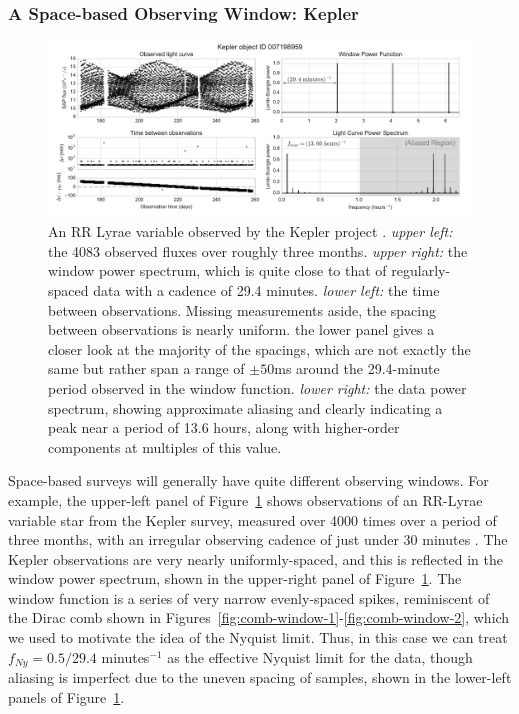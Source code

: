 \documentclass[preprint]{aastex}
\newcommand{\fig}[1]{Figure~\ref{fig:#1}}
\newcommand{\figs}[2]{Figures~\ref{fig:#1}-\ref{fig:#2}}
\newcommand{\figlabel}[1]{\label{fig:#1}}
\begin{document}
\subsubsection{A Space-based Observing Window: Kepler}

\begin{figure}[ht]
  \centering
  \includegraphics[width=\textwidth]{fig16_kepler_data}
  \caption{An RR Lyrae variable observed by the Kepler project \citep[see][]{Kolenberg2010}.
    {\it upper left:} the 4083 observed fluxes over roughly three months.
    {\it upper right:} the window power spectrum, which is quite close to that of regularly-spaced data with a cadence of 29.4 minutes.
    {\it lower left:} the time between observations. Missing measurements aside, the spacing between observations is nearly uniform. the lower panel gives a closer look at the majority of the spacings, which are not exactly the same but rather span a range of $\pm 50$ms around the 29.4-minute period observed in the window function.
    {\it lower right:} the data power spectrum, showing approximate aliasing and clearly indicating a peak near a period of 13.6 hours, along with higher-order components at multiples of this value.
    \figlabel{kepler-data}}
\end{figure}

Space-based surveys will generally have quite different observing windows.
For example, the upper-left panel of \fig{kepler-data}
shows observations of an RR-Lyrae variable star from the Kepler survey,
measured over 4000 times over a period of three months,
with an irregular observing cadence of just under 30 minutes
 \citep[For deeper discussion of these observations, see][]{Kolenberg2010}.
The Kepler observations are very nearly uniformly-spaced, and this is reflected
in the window power spectrum, shown in the upper-right panel of
\fig{kepler-data}.
The window function is a series of very narrow evenly-spaced spikes,
reminiscent of the Dirac comb shown in \figs{comb-window-1}{comb-window-2},
which we used to motivate the idea of the Nyquist limit.
Thus, in this case we can treat $f_{Ny} = 0.5/29.4$ minutes$^{-1}$ as the
effective Nyquist limit for the data, though aliasing is imperfect due to
the uneven spacing of samples, shown in the lower-left panels of
\fig{kepler-data}.
\end{document}
